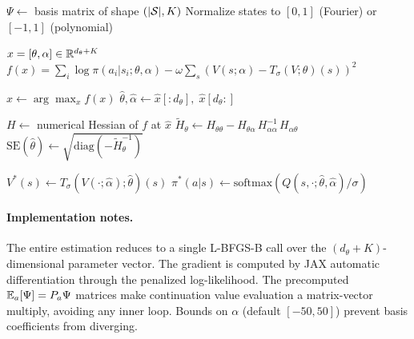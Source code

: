 \documentclass[11pt]{article}
\begin{document}
\begin{algorithm}[H]
\DontPrintSemicolon
\caption{SEES: Joint Algorithm \citep{luoSang2024}}
\label{alg:sees}
\BlankLine

$\Psi \leftarrow$ basis matrix of shape $(|\mathcal{S}|, K)$\;
Normalize states to $[0,1]$ (Fourier) or $[-1,1]$ (polynomial)\;
\BlankLine

\BlankLine

$x = [\theta, \alpha] \in \mathbb{R}^{d_\theta + K}$\;
$f(x) = \sum_i \log \pi(a_i | s_i; \theta, \alpha) - \omega \sum_s (V(s;\alpha) - T_\sigma(V;\theta)(s))^2$\;
\BlankLine

$\hat x \leftarrow \arg\max_x f(x)$ 
$\hat\theta, \hat\alpha \leftarrow \hat x[:d_\theta],\; \hat x[d_\theta:]$\;
\BlankLine

$H \leftarrow$ numerical Hessian of $f$ at $\hat x$\;
$\tilde H_\theta \leftarrow H_{\theta\theta} - H_{\theta\alpha}\, H_{\alpha\alpha}^{-1}\, H_{\alpha\theta}$\;
$\text{SE}(\hat\theta) \leftarrow \sqrt{\text{diag}(-\tilde H_\theta^{-1})}$\;
\BlankLine

$V^*(s) \leftarrow T_\sigma(V(\cdot;\hat\alpha);\hat\theta)(s)$\;
$\pi^*(a|s) \leftarrow \text{softmax}(Q(s,\cdot;\hat\theta,\hat\alpha)/\sigma)$\;
\BlankLine

\end{algorithm}

\paragraph{Implementation notes.}
The entire estimation reduces to a single L-BFGS-B call over the $(d_\theta + K)$-dimensional parameter vector. The gradient is computed by JAX automatic differentiation through the penalized log-likelihood. The precomputed $\mathbb{E}_a[\Psi] = P_a \Psi$ matrices make continuation value evaluation a matrix-vector multiply, avoiding any inner loop. Bounds on $\alpha$ (default $[-50, 50]$) prevent basis coefficients from diverging.
\end{document}
